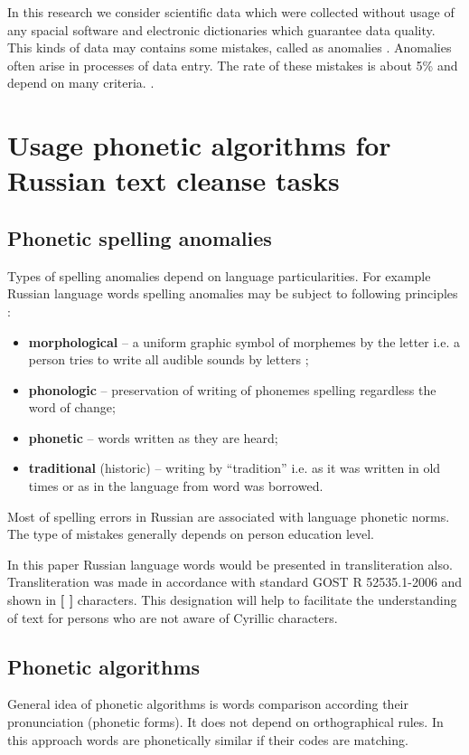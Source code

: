 \documentclass{svproc}
\begin{document}
In this research we consider scientific data which were collected without usage of any spacial software and electronic dictionaries which guarantee data quality. This kinds of data may contains some mistakes, called as anomalies \cite{Orr-1998}. Anomalies often arise in processes of data entry. The rate of these mistakes is about 5\% and depend on many criteria. \cite{Orr-1998}.


\section{Usage phonetic algorithms for Russian text cleanse tasks}
\subsection{Phonetic spelling anomalies}
Types of spelling anomalies depend on language particularities. For example Russian language words spelling anomalies may be subject to following principles \cite{Skripnik-2010}:
\begin{itemize}
\item \textbf{morphological} – a uniform graphic symbol of morphemes by the letter i.e. a person tries to write all audible sounds by letters \cite{Valgina-2002};
\item \textbf{phonologic} – preservation of writing of phonemes spelling regardless the word of change;
\item \textbf{phonetic} – words written as they are heard;
\item \textbf{traditional} (historic) – writing by “tradition” i.e. as it was written in old times or as in the language from word was borrowed.
\end{itemize}

Most of spelling errors in Russian are associated with language phonetic norms. The type of mistakes generally depends on person education level\cite{Parubchenko-2005}.

In this paper Russian language words would be presented in transliteration also. Transliteration was made in accordance with standard GOST R 52535.1-2006 \cite{GOST-2006} and shown in \textbf{[ ]} characters. This designation will help to facilitate the understanding of text for persons who are not aware of Cyrillic characters.

\subsection{Phonetic algorithms}
General idea of phonetic algorithms is words comparison according their pronunciation (phonetic forms). It does not depend on orthographical rules. In this approach words are phonetically similar if their codes are matching.
\end{document}
